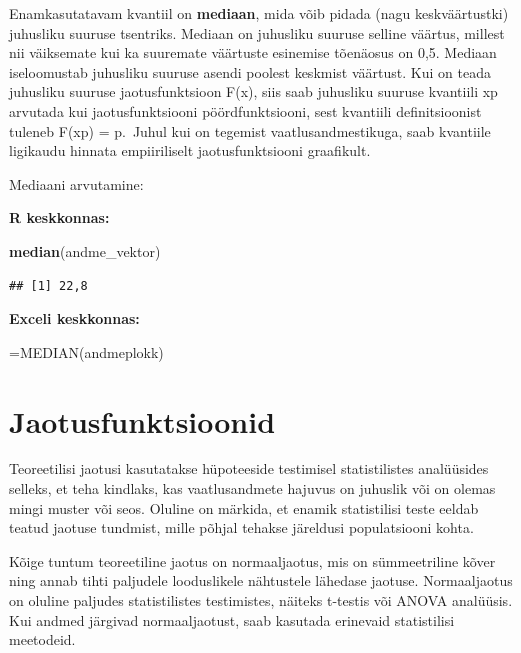 \documentclass[
]{book}
\newenvironment{Shaded}{\begin{snugshade}}{\end{snugshade}}
\newcommand{\FunctionTok}[1]{\textcolor[rgb]{0.13,0.29,0.53}{\textbf{#1}}}
\newcommand{\NormalTok}[1]{#1}
\renewenvironment{Shaded} {\begin{snugshade}\footnotesize} {\end{snugshade}}
\begin{document}
Enamkasutatavam kvantiil on \textbf{mediaan}, mida võib pidada (nagu keskväärtustki) juhusliku suuruse tsentriks. Mediaan on juhusliku suuruse selline väärtus, millest nii väiksemate kui ka suuremate väärtuste esinemise tõenäosus on 0,5. Mediaan iseloomustab juhusliku suuruse asendi poolest keskmist väärtust.
Kui on teada juhusliku suuruse jaotusfunktsioon F(x), siis saab juhusliku suuruse kvantiili xp arvutada kui jaotusfunktsiooni pöördfunktsiooni, sest kvantiili definitsioonist tuleneb F(xp) = p.~Juhul kui on tegemist vaatlusandmestikuga, saab kvantiile ligikaudu hinnata empiiriliselt jaotusfunktsiooni graafikult.

Mediaani arvutamine:

\textbf{R keskkonnas:}

\begin{Shaded}
\begin{Highlighting}[]
\FunctionTok{median}\NormalTok{(andme\_vektor)}
\end{Highlighting}
\end{Shaded}

\begin{verbatim}
## [1] 22,8
\end{verbatim}

\textbf{Exceli keskkonnas:}

\begin{Shaded}
\begin{Highlighting}[]
\NormalTok{=MEDIAN(andmeplokk)}
\end{Highlighting}
\end{Shaded}

\chapter{Jaotusfunktsioonid}\label{jaotusfunktsioonid}

Teoreetilisi jaotusi kasutatakse hüpoteeside testimisel statistilistes analüüsides selleks, et teha kindlaks, kas vaatlusandmete hajuvus on juhuslik või on olemas mingi muster või seos. Oluline on märkida, et enamik statistilisi teste eeldab teatud jaotuse tundmist, mille põhjal tehakse järeldusi populatsiooni kohta.

Kõige tuntum teoreetiline jaotus on normaaljaotus, mis on sümmeetriline kõver ning annab tihti paljudele looduslikele nähtustele lähedase jaotuse. Normaaljaotus on oluline paljudes statistilistes testimistes, näiteks t-testis või ANOVA analüüsis. Kui andmed järgivad normaaljaotust, saab kasutada erinevaid statistilisi meetodeid.
\end{document}
